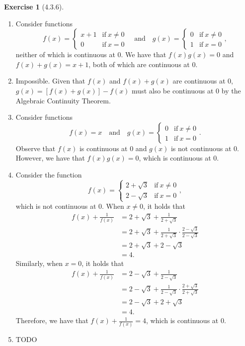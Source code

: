 \documentclass{amsart}
\theoremstyle{definition}
\newtheorem{exercise}{Exercise}
\begin{document}
\begin{exercise}[4.3.6]
  \begin{enumerate}[label={(\alph*)}]
    \item Consider functions
      \[
        f(x) =
        \begin{cases}
          x + 1 & \text{if}\ x \neq 0 \\
          0 & \text{if}\ x = 0
        \end{cases}
        \quad \text{and} \quad
        g(x) =
        \begin{cases}
          0 & \text{if}\ x \neq 0 \\
          1 & \text{if}\ x = 0
        \end{cases},
      \]
      neither of which is continuous at 0.
      We have that $f(x) g(x) = 0$ and $f(x) + g(x) = x + 1$, both of which are
      continuous at 0.
    \item Impossible. Given that $f(x)$ and $f(x) + g(x)$ are continuous at
      0, $g(x) = [f(x) + g(x)] - f(x)$ must also be continuous at 0 by the
      Algebraic Continuity Theorem.
    \item Consider functions
      \[
        f(x) = x
        \quad \text{and} \quad
        g(x) =
        \begin{cases}
          0 & \text{if}\ x \neq 0 \\
          1 & \text{if}\ x = 0
        \end{cases}.
      \]
      Observe that $f(x)$ is continuous at 0 and $g(x)$ is not continuous at 0.
      However, we have that $f(x) g(x) = 0$, which is continuous at 0.
    \item Consider the function
      \[
        f(x) =
        \begin{cases}
          2 + \sqrt{3} & \text{if}\ x \neq 0 \\
          2 - \sqrt{3} & \text{if}\ x = 0
        \end{cases},
      \]
      which is not continuous at 0. When $x \neq 0$, it holds that
      \begin{align*}
        f(x) + \frac{1}{f(x)} &= 2 + \sqrt{3} + \frac{1}{2 + \sqrt{3}} \\
        &= 2 + \sqrt{3} + \frac{1}{2 + \sqrt{3}} \cdot \frac{2 - \sqrt{3}}{2 -
        \sqrt{3}} \\
        &= 2 + \sqrt{3} + 2 - \sqrt{3} \\
        &= 4.
      \end{align*}
      Similarly, when $x = 0$, it holds that
      \begin{align*}
        f(x) + \frac{1}{f(x)} &= 2 - \sqrt{3} + \frac{1}{2 - \sqrt{3}} \\
        &= 2 - \sqrt{3} + \frac{1}{2 - \sqrt{3}} \cdot \frac{2 + \sqrt{3}}{2 +
        \sqrt{3}} \\
        &= 2 - \sqrt{3} + 2 + \sqrt{3} \\
        &= 4.
      \end{align*}
      Therefore, we have that $f(x) + \frac{1}{f(x)} = 4$, which is continuous
      at 0.
    \item TODO
  \end{enumerate}
\end{exercise}
\end{document}
